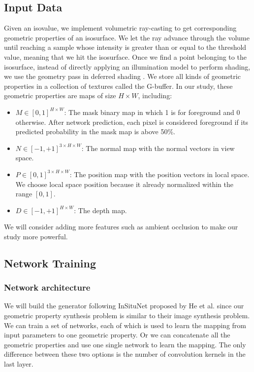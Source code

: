 \documentclass[journal]{vgtc}                %
\begin{document}
\subsection{Input Data}
Given an isovalue, we implement volumetric ray-casting to get corresponding geometric properties of an isosurface. We let the ray advance through the volume until reaching a sample whose intensity is greater than or equal to the threshold value, meaning that we hit the isosurface. Once we find a point belonging to the isosurface, instead of directly applying an illumination model to perform shading, we use the geometry pass in deferred shading \cite{deering1988triangle}. We store all kinds of geometric properties in a collection of textures called the G-buffer. In our study, these geometric properties are maps of size $ H \times W $,  including:

\begin{itemize}
\item $M \in [0, 1] ^ {H \times W}$: The mask binary map in which 1 is for foreground and 0 otherwise. After network prediction, each pixel is considered foreground if its predicted probability in the mask map is above 50\%.  

\item $N \in [-1, +1] ^ {3 \times H \times W}$: The normal map with the normal vectors in view space.

\item $P \in [0, 1] ^ {3 \times H \times W}$: The position map with the position vectors in local space. We choose local space position because it already normalized within the range $[0, 1]$.

\item $D \in [-1, +1] ^ {H \times W}$: The depth map. 

\end{itemize}

We will consider adding more features such as ambient occlusion to make our study more powerful.  

\subsection{Network Training}

\subsubsection{Network architecture}
We will build the generator following InSituNet proposed by He et al. \cite{he2019insitunet} since our geometric property synthesis problem is similar to their image synthesis problem. We can train a set of networks, each of which is used to learn the mapping from input parameters to one geometric property. Or we can concatenate all the geometric properties and use one single network to learn the mapping. The only difference between these two options is the number of convolution kernels in the last layer. 
\end{document}
